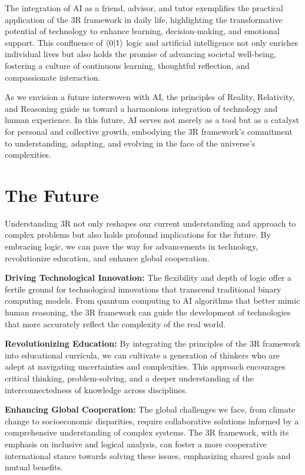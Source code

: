 \documentclass[12pt]{article}
\begin{document}
The integration of AI as a friend, advisor, and tutor exemplifies the practical application of the 3R framework in daily life, highlighting the transformative potential of technology to enhance learning, decision-making, and emotional support. This confluence of \(\langle 0 | 1 \rangle\) logic and artificial intelligence not only enriches individual lives but also holds the promise of advancing societal well-being, fostering a culture of continuous learning, thoughtful reflection, and compassionate interaction.

As we envision a future interwoven with AI, the principles of Reality, Relativity, and Reasoning guide us toward a harmonious integration of technology and human experience. In this future, AI serves not merely as a tool but as a catalyst for personal and collective growth, embodying the 3R framework's commitment to understanding, adapting, and evolving in the face of the universe's complexities.

\section*{The Future}

Understanding 3R not only reshapes our current understanding and approach to complex problems but also holds profound implications for the future. By embracing \qbit{} logic, we can pave the way for advancements in technology, revolutionize education, and enhance global cooperation.

\textbf{Driving Technological Innovation:} The flexibility and depth of \qbit{} logic offer a fertile ground for technological innovations that transcend traditional binary computing models. From quantum computing to AI algorithms that better mimic human reasoning, the 3R framework can guide the development of technologies that more accurately reflect the complexity of the real world.

\textbf{Revolutionizing Education:} By integrating the principles of the 3R framework into educational curricula, we can cultivate a generation of thinkers who are adept at navigating uncertainties and complexities. This approach encourages critical thinking, problem-solving, and a deeper understanding of the interconnectedness of knowledge across disciplines.

\textbf{Enhancing Global Cooperation:} The global challenges we face, from climate change to socioeconomic disparities, require collaborative solutions informed by a comprehensive understanding of complex systems. The 3R framework, with its emphasis on inclusive and logical analysis, can foster a more cooperative international stance towards solving these issues, emphasizing shared goals and mutual benefits.
\end{document}
